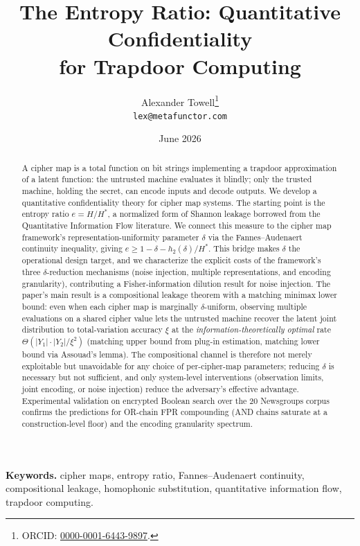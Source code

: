 \documentclass[11pt]{article}
\title{The Entropy Ratio: Quantitative Confidentiality\\for Trapdoor Computing}
\author{Alexander Towell\thanks{ORCID: \href{https://orcid.org/0000-0001-6443-9897}{0000-0001-6443-9897}.}\\\texttt{lex@metafunctor.com}}
\date{June 2026}
\theoremstyle{definition}
\theoremstyle{plain}
\theoremstyle{remark}
\begin{document}
\maketitle

\begin{abstract}
A cipher map is a total function on bit strings implementing a trapdoor
approximation of a latent function: the untrusted machine evaluates it
blindly; only the trusted machine, holding the secret, can encode inputs
and decode outputs.  We develop a quantitative confidentiality theory
for cipher map systems.  The starting point is the entropy ratio
$e = H/H^*$, a normalized form of Shannon leakage borrowed from the
Quantitative Information Flow literature.  We connect this measure to
the cipher map framework's representation-uniformity parameter $\delta$
via the Fannes--Audenaert continuity inequality, giving
$e \geq 1 - \delta - h_2(\delta)/H^*$.  This bridge makes $\delta$ the
operational design target, and we characterize the explicit costs of
the framework's three $\delta$-reduction mechanisms (noise injection,
multiple representations, and encoding granularity), contributing a
Fisher-information dilution result for noise injection.  The paper's
main result is a compositional
leakage theorem with a matching minimax lower bound: even when each
cipher map is marginally $\delta$-uniform, observing multiple
evaluations on a shared cipher value lets the untrusted machine
recover the latent joint distribution to total-variation accuracy
$\xi$ at the \emph{information-theoretically optimal} rate
$\Theta(|Y_1|\cdot|Y_2|/\xi^2)$ (matching upper bound from plug-in
estimation, matching lower bound via Assouad's lemma).  The
compositional channel is therefore not merely exploitable but
unavoidable for any choice of per-cipher-map parameters; reducing
$\delta$ is necessary but not sufficient, and only system-level
interventions (observation limits, joint encoding, or noise
injection) reduce the adversary's effective advantage.  Experimental
validation on encrypted Boolean search over the 20 Newsgroups corpus
confirms the predictions for OR-chain FPR compounding (AND chains
saturate at a construction-level floor) and the encoding granularity
spectrum.
\end{abstract}

\medskip
\noindent\textbf{Keywords.}
cipher maps, entropy ratio, Fannes--Audenaert continuity, compositional
leakage, homophonic substitution, quantitative information flow,
trapdoor computing.

\end{document}
